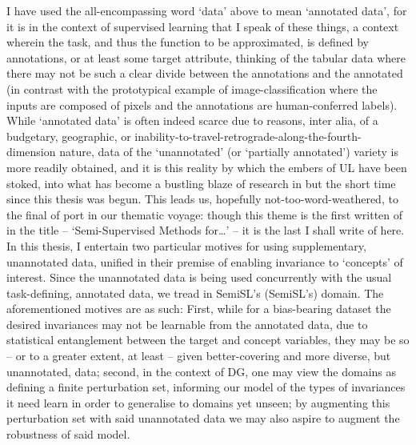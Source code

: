 %
%
I have used the all-encompassing word `data' above to mean `annotated data', for it is in the
context of supervised learning that I speak of these things, a context wherein the task, and thus
the function to be approximated, is defined by annotations, or at least some target attribute,
thinking of the tabular data where there may not be such a clear divide between the annotations and
the annotated (in contrast with the prototypical example of image-classification where the inputs
are composed of pixels and the annotations are human-conferred labels).
%
While `annotated data' is often indeed scarce due to reasons, inter alia, of a budgetary,
geographic, or inability-to-travel-retrograde-along-the-fourth-dimension nature, data of the
`unannotated' (or `partially annotated') variety is more readily obtained, and it is this reality
by which the embers of \ac{UL} have been stoked, into what has become a bustling blaze of
research in but the short time since this thesis was begun.
%
This leads us, hopefully not-too-word-weathered, to the final of port in our thematic
voyage: though this theme is the first written of in the title -- `Semi-Supervised Methods
for\dots' -- it is the last I shall write of here.
%
In this thesis, I entertain two particular motives for using supplementary, unannotated data,
unified in their premise of enabling invariance to `concepts' of interest.
%
Since the unannotated data is being used concurrently with the usual task-defining, annotated data,
we tread in \acl{SemiSL}'s (\acs{SemiSL}'s) domain.
%
The aforementioned motives are as such:
%
First, while for a bias-bearing dataset the desired invariances may not be learnable from the
annotated data, due to statistical entanglement between the target and concept variables, they may
be so -- or to a greater extent, at least -- given better-covering and more diverse, but
unannotated, data;
%
second, in the context of \ac{DG}, one may view the domains as defining a finite perturbation set,
informing our model of the types of invariances it need learn in order to generalise to domains yet
unseen; by augmenting this perturbation set with said unannotated data we may also aspire to
augment the robustness of said model.

%
